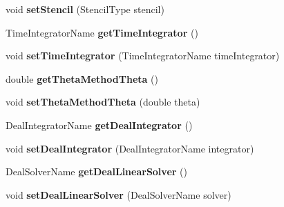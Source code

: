 \begin{DoxyCompactItemize}
\item 
\hypertarget{classnatrium_1_1SolverConfiguration_afa50192447fb027d0250a29b1ea86d1a}{
void {\bfseries setStencil} (StencilType stencil)}
\label{classnatrium_1_1SolverConfiguration_afa50192447fb027d0250a29b1ea86d1a}

\item 
\hypertarget{classnatrium_1_1SolverConfiguration_ac7e6189aaa1b54016993e852999376eb}{
TimeIntegratorName {\bfseries getTimeIntegrator} ()}
\label{classnatrium_1_1SolverConfiguration_ac7e6189aaa1b54016993e852999376eb}

\item 
\hypertarget{classnatrium_1_1SolverConfiguration_ac58399f50e64bc8b0efde5b51e246aeb}{
void {\bfseries setTimeIntegrator} (TimeIntegratorName timeIntegrator)}
\label{classnatrium_1_1SolverConfiguration_ac58399f50e64bc8b0efde5b51e246aeb}

\item 
\hypertarget{classnatrium_1_1SolverConfiguration_a0e2606b5c10964a08e7107dbe079a1ed}{
double {\bfseries getThetaMethodTheta} ()}
\label{classnatrium_1_1SolverConfiguration_a0e2606b5c10964a08e7107dbe079a1ed}

\item 
\hypertarget{classnatrium_1_1SolverConfiguration_acb2153b276dfc0e28bb2cabf8855acd0}{
void {\bfseries setThetaMethodTheta} (double theta)}
\label{classnatrium_1_1SolverConfiguration_acb2153b276dfc0e28bb2cabf8855acd0}

\item 
\hypertarget{classnatrium_1_1SolverConfiguration_a5ba156b86d81572776d8c20b04f21dcc}{
DealIntegratorName {\bfseries getDealIntegrator} ()}
\label{classnatrium_1_1SolverConfiguration_a5ba156b86d81572776d8c20b04f21dcc}

\item 
\hypertarget{classnatrium_1_1SolverConfiguration_acf54eacaa0135343d69a31f0bbc8031c}{
void {\bfseries setDealIntegrator} (DealIntegratorName integrator)}
\label{classnatrium_1_1SolverConfiguration_acf54eacaa0135343d69a31f0bbc8031c}

\item 
\hypertarget{classnatrium_1_1SolverConfiguration_a0678dd0f89508e37c5c555413d5dc258}{
DealSolverName {\bfseries getDealLinearSolver} ()}
\label{classnatrium_1_1SolverConfiguration_a0678dd0f89508e37c5c555413d5dc258}

\item 
\hypertarget{classnatrium_1_1SolverConfiguration_a63ab4a5ff44381dfff6558c030fa3665}{
void {\bfseries setDealLinearSolver} (DealSolverName solver)}
\label{classnatrium_1_1SolverConfiguration_a63ab4a5ff44381dfff6558c030fa3665}


\end{DoxyCompactItemize}
